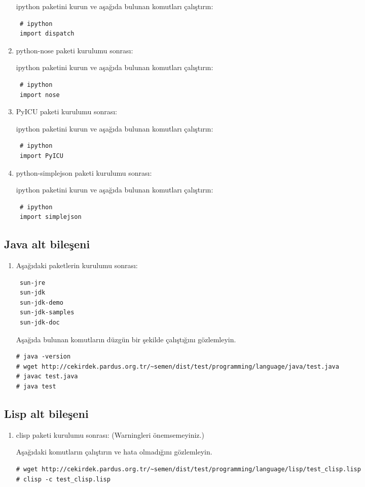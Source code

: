 \documentclass[a4paper,10pt]{article}
\begin{document}
\begin{enumerate}
ipython paketini kurun ve aşağıda bulunan komutları çalıştırın:
\begin{verbatim}
 # ipython
 import dispatch
\end{verbatim}

\item python-nose paketi kurulumu sonrası:  

ipython paketini kurun ve aşağıda bulunan komutları çalıştırın:
\begin{verbatim}
 # ipython
 import nose
\end{verbatim}

\item PyICU paketi kurulumu sonrası:  

ipython paketini kurun ve aşağıda bulunan komutları çalıştırın:
\begin{verbatim}
 # ipython
 import PyICU
\end{verbatim}

\item python-simplejson paketi kurulumu sonrası:  

ipython paketini kurun ve aşağıda bulunan komutları çalıştırın:
\begin{verbatim}
 # ipython
 import simplejson
\end{verbatim}

\end{enumerate}

\subsection{Java alt bileşeni}
\begin{enumerate}
 \item Aşağıdaki paketlerin kurulumu sonrası:
\begin{verbatim}
 sun-jre
 sun-jdk
 sun-jdk-demo
 sun-jdk-samples
 sun-jdk-doc
\end{verbatim}

Aşağıda bulunan komutların düzgün bir şekilde çalıştığını gözlemleyin.
\begin{verbatim}
# java -version
# wget http://cekirdek.pardus.org.tr/~semen/dist/test/programming/language/java/test.java
# javac test.java
# java test
\end{verbatim}
\end{enumerate}
\subsection{Lisp alt bileşeni}
\begin{enumerate}
 \item clisp paketi kurulumu sonrası: (Warningleri önemsemeyiniz.)

Aşağıdaki komutların çalıştırın ve hata olmadığını gözlemleyin.
\begin{verbatim}
# wget http://cekirdek.pardus.org.tr/~semen/dist/test/programming/language/lisp/test_clisp.lisp 
# clisp -c test_clisp.lisp
\end{verbatim}

\end{enumerate}
\end{document}
